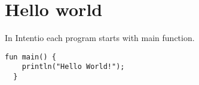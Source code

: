 \chapter{Hello world}

In Intentio each program starts with main function.

\begin{example}
\begin{lstlisting}[language=intentio,mathescape=true]
  fun main() {
    println("Hello World!");
  }
\end{lstlisting}
\end{example}
